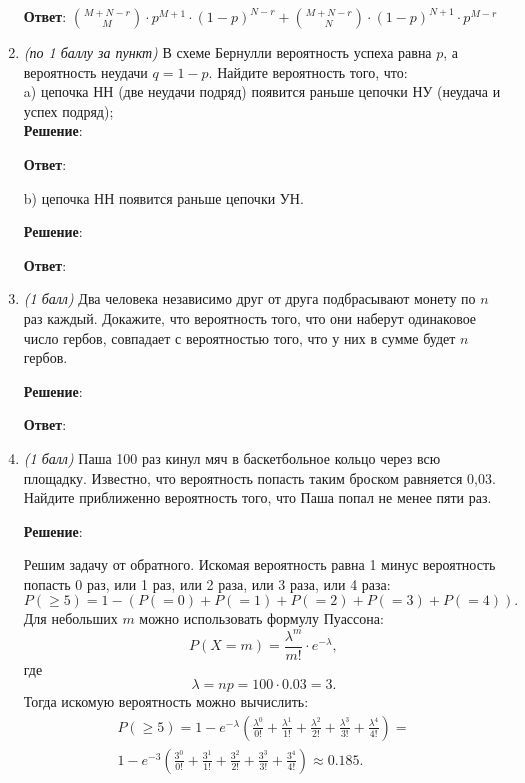 \documentclass{article}
\begin{document}
\begin{enumerate}
    \textbf{Ответ}:
    $\binom{M+N-r}{M} \cdot p^{M+1} \cdot (1-p)^{N-r} + \binom{M+N-r}{N} \cdot (1-p)^{N+1} \cdot p^{M-r}$
    
    \item \textit{(по 1 баллу за пункт)}  В схеме Бернулли вероятность успеха равна $p$, а вероятность неудачи $q = 1-p$. Найдите вероятность того, что:\\
    a) цепочка НН (две неудачи подряд) появится раньше цепочки НУ (неудача и успех подряд);\\

    \textbf{Решение}:





    \textbf{Ответ}:

    b) цепочка НН появится раньше цепочки УН.

    \textbf{Решение}:





    \textbf{Ответ}:
    
    \item \textit{(1 балл)} Два человека независимо друг от друга подбрасывают монету по $n$ раз каждый. Докажите, что вероятность того, что они наберут одинаковое число гербов, совпадает с вероятностью того, что у них в сумме будет $n$ гербов.
    

    \textbf{Решение}:





    \textbf{Ответ}:
    
    \item \textit{(1 балл)} Паша 100 раз кинул мяч в баскетбольное кольцо через всю площадку. Известно, что вероятность попасть таким броском равняется 0,03. Найдите приближенно вероятность того, что Паша попал не менее пяти раз.
    

    \textbf{Решение}:

    Решим задачу от обратного. Искомая вероятность равна 1 минус вероятность попасть 0 раз, или 1 раз, или 2 раза, или 3 раза, или 4 раза:
    \begin{equation}
        P(\geq 5) = 1 - (P(=0) + P(=1) + P(=2) + P(=3) + P(=4)).
    \end{equation}
    Для небольших $m$ можно использовать формулу Пуассона:
    \begin{equation}
        P(X = m) = \frac{\lambda^m}{m!}\cdot e^{-\lambda},
    \end{equation}
    где
    \begin{equation}
        \lambda = np = 100 \cdot 0.03 = 3.
    \end{equation}
    Тогда искомую вероятность можно вычислить:
    \begin{eqnarray}
        P(\geq 5) = 1 - e^{-\lambda}(\frac{\lambda^0}{0!} + \frac{\lambda^1}{1!} + \frac{\lambda^2}{2!} + \frac{\lambda^3}{3!} + \frac{\lambda^4}{4!}) = \\
        1 - e^{-3}(\frac{3^0}{0!} + \frac{3^1}{1!} + \frac{3^2}{2!} + \frac{3^3}{3!} + \frac{3^4}{4!}) \approx 0.185.
    \end{eqnarray}


\end{enumerate}
\end{document}
